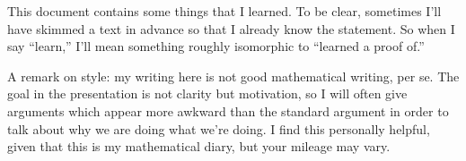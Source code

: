 This document contains some things that I learned. To be clear, sometimes I'll have skimmed a text in advance so that I already know the statement. So when I say ``learn,'' I'll mean something roughly isomorphic to ``learned a proof of.''

A remark on style: my writing here is not good mathematical writing, per se. The goal in the presentation is not clarity but motivation, so I will often give arguments which appear more awkward than the standard argument in order to talk about why we are doing what we're doing. I find this personally helpful, given that this is my mathematical diary, but your mileage may vary.